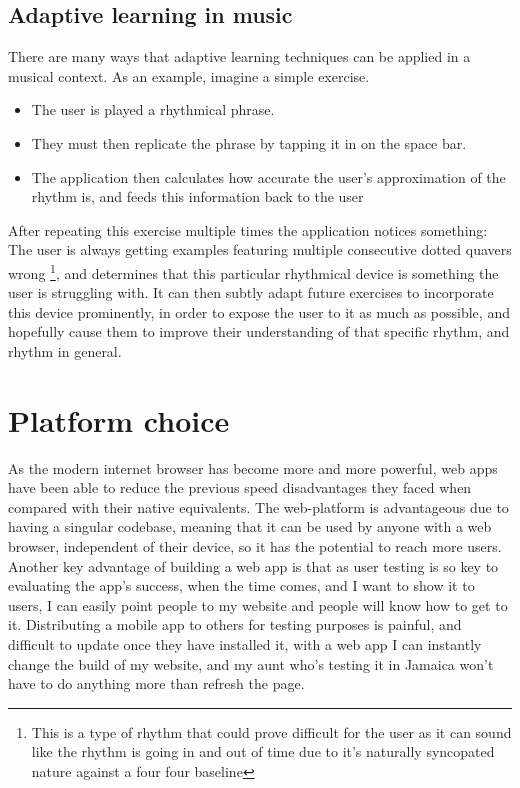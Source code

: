 	
	\subsection{Adaptive learning in music}
		There are many ways that adaptive learning techniques can be applied in a musical context. As an example, imagine a simple exercise.
		\begin{itemize}
			\item The user is played a rhythmical phrase.
			\item They must then replicate the phrase by tapping it in on the space bar. 
			\item The application then calculates how accurate the user's approximation of the rhythm is, and feeds this information back to the user
		\end{itemize}
		After repeating this exercise multiple times the application notices something: The user is always getting examples featuring multiple consecutive dotted quavers wrong		\footnote{This is a type of rhythm that could prove difficult for the user as it can sound like the rhythm is going in and out of time due to it's naturally syncopated nature 		against a four four baseline}, and determines that this particular rhythmical device is something the user is struggling with. It can then subtly adapt future exercises to 	incorporate this device prominently, in order to expose the user to it as much as possible, and hopefully cause them to improve their understanding of that specific rhythm, and rhythm in general.
	\section{Platform choice}
	As the modern internet browser has become more and more powerful, web apps have been able to reduce the previous speed disadvantages they faced when compared with their native equivalents. The web-platform is advantageous due to having a singular codebase, meaning that it can be used by anyone with a web browser, independent of their device, so it has the potential to reach more users. Another key advantage of building a web app is that as user testing is so key to evaluating the app's success, when the time comes, and I want to show it to users, I can easily point people to my website and people will know how to get to it. Distributing a mobile app to others for testing purposes is painful, and difficult to update once they have installed it, with a web app I can instantly change the build of my website, and my aunt who's testing it in Jamaica won't have to do anything more than refresh the page.
